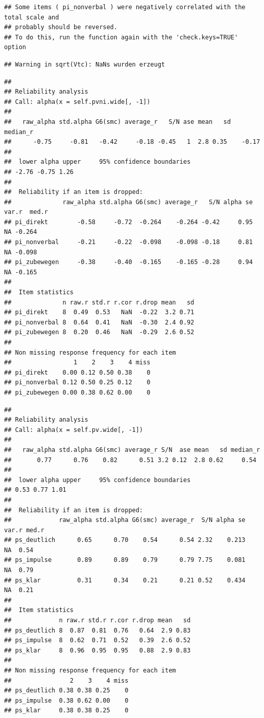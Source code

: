 \documentclass[
  english,
  man,floatsintext]{apa6}
\begin{document}
\begin{verbatim}
## Some items ( pi_nonverbal ) were negatively correlated with the total scale and 
## probably should be reversed.  
## To do this, run the function again with the 'check.keys=TRUE' option
\end{verbatim}

\begin{verbatim}
## Warning in sqrt(Vtc): NaNs wurden erzeugt
\end{verbatim}

\begin{verbatim}
## 
## Reliability analysis   
## Call: alpha(x = self.pvni.wide[, -1])
## 
##   raw_alpha std.alpha G6(smc) average_r   S/N ase mean   sd median_r
##      -0.75     -0.81   -0.42     -0.18 -0.45   1  2.8 0.35    -0.17
## 
##  lower alpha upper     95% confidence boundaries
## -2.76 -0.75 1.26 
## 
##  Reliability if an item is dropped:
##              raw_alpha std.alpha G6(smc) average_r   S/N alpha se var.r  med.r
## pi_direkt        -0.58     -0.72  -0.264    -0.264 -0.42     0.95    NA -0.264
## pi_nonverbal     -0.21     -0.22  -0.098    -0.098 -0.18     0.81    NA -0.098
## pi_zubewegen     -0.38     -0.40  -0.165    -0.165 -0.28     0.94    NA -0.165
## 
##  Item statistics 
##              n raw.r std.r r.cor r.drop mean   sd
## pi_direkt    8  0.49  0.53   NaN  -0.22  3.2 0.71
## pi_nonverbal 8  0.64  0.41   NaN  -0.30  2.4 0.92
## pi_zubewegen 8  0.20  0.46   NaN  -0.29  2.6 0.52
## 
## Non missing response frequency for each item
##                 1    2    3    4 miss
## pi_direkt    0.00 0.12 0.50 0.38    0
## pi_nonverbal 0.12 0.50 0.25 0.12    0
## pi_zubewegen 0.00 0.38 0.62 0.00    0
\end{verbatim}

\begin{verbatim}
## 
## Reliability analysis   
## Call: alpha(x = self.pv.wide[, -1])
## 
##   raw_alpha std.alpha G6(smc) average_r S/N  ase mean   sd median_r
##       0.77      0.76    0.82      0.51 3.2 0.12  2.8 0.62     0.54
## 
##  lower alpha upper     95% confidence boundaries
## 0.53 0.77 1.01 
## 
##  Reliability if an item is dropped:
##             raw_alpha std.alpha G6(smc) average_r  S/N alpha se var.r med.r
## ps_deutlich      0.65      0.70    0.54      0.54 2.32    0.213    NA  0.54
## ps_impulse       0.89      0.89    0.79      0.79 7.75    0.081    NA  0.79
## ps_klar          0.31      0.34    0.21      0.21 0.52    0.434    NA  0.21
## 
##  Item statistics 
##             n raw.r std.r r.cor r.drop mean   sd
## ps_deutlich 8  0.87  0.81  0.76   0.64  2.9 0.83
## ps_impulse  8  0.62  0.71  0.52   0.39  2.6 0.52
## ps_klar     8  0.96  0.95  0.95   0.88  2.9 0.83
## 
## Non missing response frequency for each item
##                2    3    4 miss
## ps_deutlich 0.38 0.38 0.25    0
## ps_impulse  0.38 0.62 0.00    0
## ps_klar     0.38 0.38 0.25    0
\end{verbatim}
\end{document}
